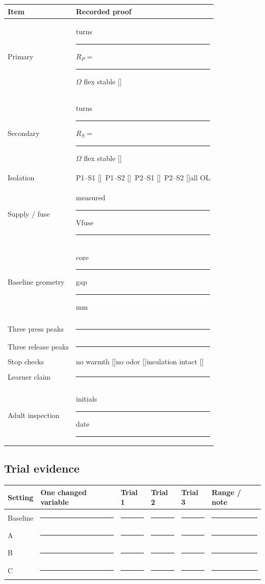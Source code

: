 \begin{center}\small
\begin{tabularx}{\linewidth}{@{}p{.25\linewidth}L@{}}
\toprule
Item & Recorded proof\\
\midrule
Primary & turns \rule{1.3cm}{.3pt}\quad \(R_P=\)\rule{1.5cm}{.3pt}\(\Omega\)
\quad flex stable [\enspace]\\[.8em]
Secondary & turns \rule{1.3cm}{.3pt}\quad \(R_S=\)\rule{1.5cm}{.3pt}\(\Omega\)
\quad flex stable [\enspace]\\[.8em]
Isolation & P1--S1 [\enspace]\ P1--S2 [\enspace]\ P2--S1 [\enspace]\
P2--S2 [\enspace]\quad all OL\\[.8em]
Supply / fuse & measured \rule{1.3cm}{.3pt} V\quad fuse \rule{1.5cm}{.3pt}\\[.8em]
Baseline geometry & core \rule{1.5cm}{.3pt}\quad gap \rule{1.1cm}{.3pt} mm\\[.8em]
Three press peaks & \rule{.86\linewidth}{.3pt}\\[.8em]
Three release peaks & \rule{.86\linewidth}{.3pt}\\[.8em]
Stop checks & no warmth [\enspace]\quad no odor [\enspace]\quad insulation intact [\enspace]\\[.8em]
Learner claim & \rule{.86\linewidth}{.3pt}\\[1.1em]
Adult inspection & initials \rule{1.5cm}{.3pt}\quad date \rule{2cm}{.3pt}\\
\bottomrule
\end{tabularx}
\end{center}

\subsection{Trial evidence}
\begin{center}\small
\begin{tabularx}{\linewidth}{@{}p{.16\linewidth}p{.20\linewidth}
p{.14\linewidth}p{.14\linewidth}p{.14\linewidth}L@{}}
\toprule
Setting & One changed variable & Trial 1 & Trial 2 & Trial 3 & Range / note\\
\midrule
Baseline & \rule{2cm}{.3pt} & \rule{1cm}{.3pt} & \rule{1cm}{.3pt} &
\rule{1cm}{.3pt} & \rule{1.3cm}{.3pt}\\[.8em]
A & \rule{2cm}{.3pt} & \rule{1cm}{.3pt} & \rule{1cm}{.3pt} &
\rule{1cm}{.3pt} & \rule{1.3cm}{.3pt}\\[.8em]
B & \rule{2cm}{.3pt} & \rule{1cm}{.3pt} & \rule{1cm}{.3pt} &
\rule{1cm}{.3pt} & \rule{1.3cm}{.3pt}\\[.8em]
C & \rule{2cm}{.3pt} & \rule{1cm}{.3pt} & \rule{1cm}{.3pt} &
\rule{1cm}{.3pt} & \rule{1.3cm}{.3pt}\\
\bottomrule
\end{tabularx}
\end{center}

